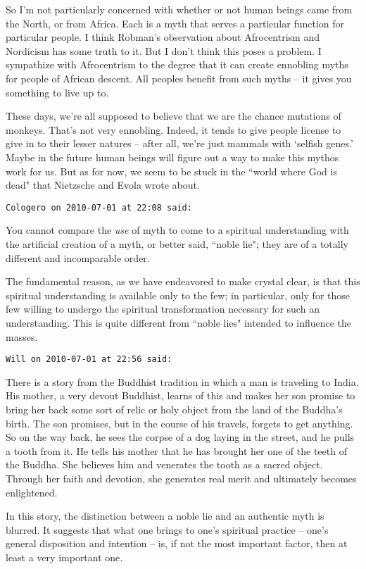 \begin{footnotesize}
\begin{sffamily}
So I'm not particularly concerned with whether or not human beings came from the North, or from Africa. Each is a myth that serves a particular function for particular people. I think Robman's observation about Afrocentrism and Nordicism has some truth to it. But I don't think this poses a problem. I sympathize with Afrocentrism to the degree that it can create ennobling myths for people of African descent. All peoples benefit from such myths – it gives you something to live up to.

These days, we're all supposed to believe that we are the chance mutations of monkeys. That's not very ennobling. Indeed, it tends to give people license to give in to their lesser natures – after all, we're just mammals with `selfish genes.' Maybe in the future human beings will figure out a way to make this mythos work for us. But as for now, we seem to be stuck in the ``world where God is dead" that Nietzsche and Evola wrote about.


\hfill

\texttt{Cologero on 2010-07-01 at 22:08 said: }

You cannot compare the \emph{use }of myth to come to a spiritual understanding with the artificial creation of a myth, or better said, ``noble lie"; they are of a totally different and incomparable order.

The fundamental reason, as we have endeavored to make crystal clear, is that this spiritual understanding is available only to the few; in particular, only for those few willing to undergo the spiritual transformation necessary for such an understanding. This is quite different from ``noble lies" intended to influence the masses.


\hfill

\texttt{Will on 2010-07-01 at 22:56 said: }

There is a story from the Buddhist tradition in which a man is traveling to India. His mother, a very devout Buddhist, learns of this and makes her son promise to bring her back some sort of relic or holy object from the land of the Buddha's birth. The son promises, but in the course of his travels, forgets to get anything. So on the way back, he sees the corpse of a dog laying in the street, and he pulls a tooth from it. He tells his mother that he has brought her one of the teeth of the Buddha. She believes him and venerates the tooth as a sacred object. Through her faith and devotion, she generates real merit and ultimately becomes enlightened.

In this story, the distinction between a noble lie and an authentic myth is blurred. It suggests that what one brings to one's spiritual practice – one's general disposition and intention – is, if not the most important factor, then at least a very important one.


\end{sffamily}
\end{footnotesize}
